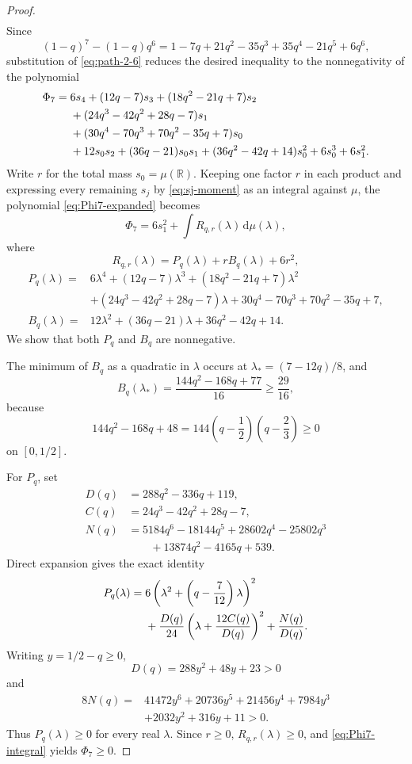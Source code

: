\documentclass[11pt]{article}
\numberwithin{equation}{section}
\newcommand{\R}{\mathbb R}
\newcommand{\dd}{\,\mathrm d}
\begin{document}
\begin{proof}
\begin{align}
  \end{align}
  Since
  \[
    (1-q)^7-(1-q)q^6
    =1-7q+21q^2-35q^3+35q^4-21q^5+6q^6,
  \]
  substitution of \eqref{eq:path-2-6} reduces the desired inequality to the nonnegativity of the polynomial
  \begin{align}
    \Phi_7={}&6s_4+(12q-7)s_3+(18q^2-21q+7)s_2 \notag\\
    &+(24q^3-42q^2+28q-7)s_1 \notag\\
    &+(30q^4-70q^3+70q^2-35q+7)s_0 \notag\\
    &+12s_0s_2+(36q-21)s_0s_1
    +(36q^2-42q+14)s_0^2+6s_0^3+6s_1^2. \label{eq:Phi7-expanded}
  \end{align}
  Write $r$ for the total mass $s_0=\mu(\R)$.  Keeping one factor $r$ in each
  product and expressing every remaining $s_j$ by \eqref{eq:sj-moment} as an
  integral against $\mu$, the polynomial \eqref{eq:Phi7-expanded} becomes
  \begin{equation}\label{eq:Phi7-integral}
    \Phi_7=6s_1^2+\int R_{q,r}(\lambda)\dd\mu(\lambda),
  \end{equation}
  where
  \[
    R_{q,r}(\lambda)=P_q(\lambda)+rB_q(\lambda)+6r^2,
  \]
  \begin{align*}
    P_q(\lambda)={}&6\lambda^4+(12q-7)\lambda^3
    +(18q^2-21q+7)\lambda^2\\
    &+(24q^3-42q^2+28q-7)\lambda
    +30q^4-70q^3+70q^2-35q+7,\\
    B_q(\lambda)={}&12\lambda^2+(36q-21)\lambda+36q^2-42q+14.
  \end{align*}
  We show that both $P_q$ and $B_q$ are nonnegative.

  The minimum of $B_q$ as a quadratic in $\lambda$ occurs at
  $\lambda_*=(7-12q)/8$, and
  \[
    B_q(\lambda_*)=\frac{144q^2-168q+77}{16}\ge\frac{29}{16},
  \]
  because
  \[
    144q^2-168q+48=144\left(q-\frac{1}{2}\right)
    \left(q-\frac{2}{3}\right)\ge0
  \]
  on $[0,1/2]$.

  For $P_q$, set
  \begin{align*}
    D(q)&=288q^2-336q+119,\\
    C(q)&=24q^3-42q^2+28q-7,\\
    N(q)&=5184q^6-18144q^5+28602q^4-25802q^3\\
    &\qquad+13874q^2-4165q+539.
  \end{align*}
  Direct expansion gives the exact identity
  \begin{align}
    P_q(\lambda)
    ={}&6\left(\lambda^2+\left(q-\frac{7}{12}\right)\lambda\right)^2 \notag\\
    &+\frac{D(q)}{24}
    \left(\lambda+\frac{12C(q)}{D(q)}\right)^2
    +\frac{N(q)}{D(q)}. \label{eq:Pq-SOS}
  \end{align}
  Writing $y=1/2-q\ge0$,
  \[
    D(q)=288y^2+48y+23>0
  \]
  and
  \begin{align*}
    8N(q)={}&41472y^6+20736y^5+21456y^4+7984y^3\\
    &+2032y^2+316y+11>0.
  \end{align*}
  Thus $P_q(\lambda)\ge0$ for every real $\lambda$.  Since
  $r\ge0$, $R_{q,r}(\lambda)\ge0$, and \eqref{eq:Phi7-integral} yields
  $\Phi_7\ge0$.
\end{proof}
\end{document}
